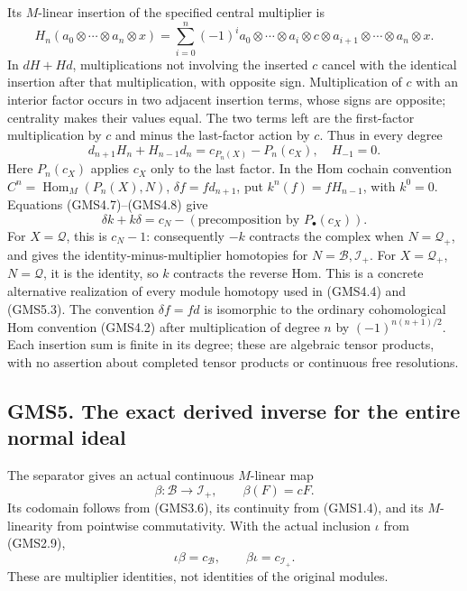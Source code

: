 Its \(M\)-linear insertion of the specified central multiplier is \[
H_n(a_0\otimes\cdots\otimes a_n\otimes x)
=\sum_{i=0}^n(-1)^i
a_0\otimes\cdots\otimes a_i\otimes c\otimes a_{i+1}
\otimes\cdots\otimes a_n\otimes x.
\tag{GMS4.7}
\] In \(dH+Hd\), multiplications not involving the inserted \(c\) cancel
with the identical insertion after that multiplication, with opposite
sign. Multiplication of \(c\) with an interior factor occurs in two
adjacent insertion terms, whose signs are opposite; centrality makes
their values equal. The two terms left are the first-factor
multiplication by \(c\) and minus the last-factor action by \(c\). Thus
in every degree \[
d_{n+1}H_n+H_{n-1}d_n=c_{P_n(X)}-P_n(c_X),
\quad H_{-1}=0.
\tag{GMS4.8}
\] Here \(P_n(c_X)\) applies \(c_X\) only to the last factor. In the Hom
cochain convention \(C^n=\operatorname{Hom}_M(P_n(X),N)\),
\(\delta f=f d_{n+1}\), put \(k^n(f)=fH_{n-1}\), with \(k^0=0\).
Equations (GMS4.7)--(GMS4.8) give \[
\delta k+k\delta=c_N- (\text{precomposition by }P_\bullet(c_X)).
\tag{GMS4.9}
\] For \(X=\mathcal Q\), this is \(c_N-1\): consequently \(-k\)
contracts the complex when \(N=\mathcal Q_+\), and gives the
identity-minus-multiplier homotopies for \(N=\mathcal B,\mathcal I_+\).
For \(X=\mathcal Q_+\), \(N=\mathcal Q\), it is the identity, so \(k\)
contracts the reverse Hom. This is a concrete alternative realization of
every module homotopy used in (GMS4.4) and (GMS5.3). The convention
\(\delta f=f d\) is isomorphic to the ordinary cohomological Hom
convention (GMS4.2) after multiplication of degree \(n\) by
\((-1)^{n(n+1)/2}\). Each insertion sum is finite in its degree; these
are algebraic tensor products, with no assertion about completed tensor
products or continuous free resolutions.

\subsection{GMS5. The exact derived inverse for the entire normal
ideal}\label{gms5.-the-exact-derived-inverse-for-the-entire-normal-ideal}

The separator gives an actual continuous \(M\)-linear map \[
\beta:\mathcal B\longrightarrow\mathcal I_+,\qquad
\beta(F)=cF.
\tag{GMS5.1}
\] Its codomain follows from (GMS3.6), its continuity from (GMS1.4), and
its \(M\)-linearity from pointwise commutativity. With the actual
inclusion \(\iota\) from (GMS2.9), \[
\iota\beta=c_{\mathcal B},\qquad
\beta\iota=c_{\mathcal I_+}.
\tag{GMS5.2}
\] These are multiplier identities, not identities of the original
modules.

